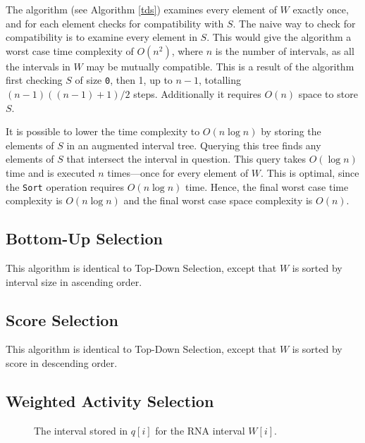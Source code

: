 \documentclass{cshonours}
\begin{document}
	
The algorithm (see Algorithm \ref{tds}) examines every element of $W$ exactly once, and for each element checks for compatibility with $S$. The naive way to check for compatibility is to examine every element in $S$. This would give the algorithm a worst case time complexity of $O(n^2)$, where $n$ is the number of intervals, as all the intervals in $W$ may be mutually compatible. This is a result of the algorithm first checking $S$ of size \texttt{0}, then 1, up to $n-1$, totalling $(n-1)((n-1)+1) / 2$ steps. Additionally it requires $O(n)$ space to store $S$.

It is possible to lower the time complexity to $O(n \log n)$ by storing the elements of $S$ in an augmented interval tree. Querying this tree finds any elements of $S$ that intersect the interval in question. This query takes $O(\log n)$ time and is executed $n$ times---once for every element of $W$. This is optimal, since the \texttt{Sort} operation requires $O(n \log n)$ time. Hence, the final worst case time complexity is $O(n \log n)$ and the final worst case space complexity is $O(n)$.


\subsection{Bottom-Up Selection}
This algorithm is identical to Top-Down Selection, except that $W$ is sorted by interval size in ascending order.

\subsection{Score Selection}
This algorithm is identical to Top-Down Selection, except that $W$ is sorted by score in descending order.


\subsection{Weighted Activity Selection}

\begin{figure}
\begin{center}
\end{center}
\caption{The interval stored in $q[i]$ for the RNA interval $W[i]$.}
\label{fig:rightcompat}
\end{figure}
\end{document}
